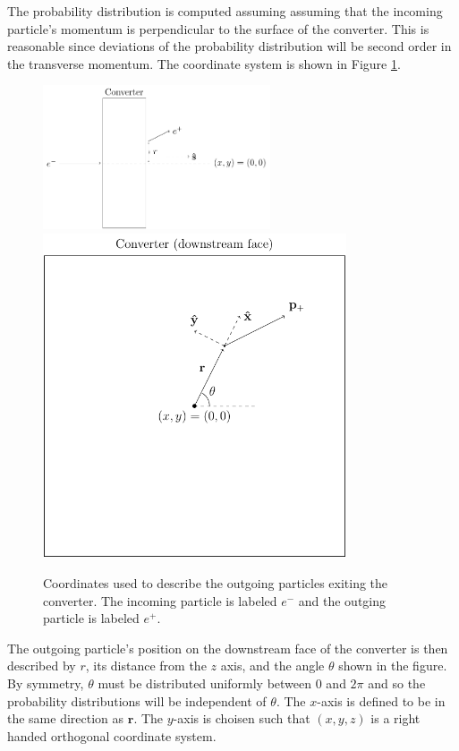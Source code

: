 \documentclass[12pt]{article}
\newcommand{\rrr}{\mathbf{r}}
\begin{document}
The probability distribution is computed assuming assuming that the incoming particle's momentum is
perpendicular to the surface of the converter. This is reasonable since deviations of the
probability distribution will be second order in the transverse momentum. The coordinate system is
shown in Figure \ref{fig:coords}.
\begin{figure}
\centering
\includegraphics[width=0.6\textwidth]{coords1.pdf}
\includegraphics[width=0.8\textwidth]{coords2.pdf}
\caption{Coordinates used to describe the outgoing particles exiting the converter. The incoming particle is
labeled $e^-$ and the outging particle is labeled $e^+$.}
\label{fig:coords}
\end{figure}
The outgoing particle's position on the downstream face of the converter is then described by $r$,
its distance from the $z$ axis, and the angle $\theta$ shown in the figure. By symmetry, $\theta$
must be distributed uniformly between $0$ and $2\pi$ and so the probability distributions will be
independent of $\theta$. The $x$-axis is defined to be in the same direction as $\rrr$. The
$y$-axis is choisen such that $(x,y,z)$ is a right handed orthogonal coordinate system.
\end{document}
